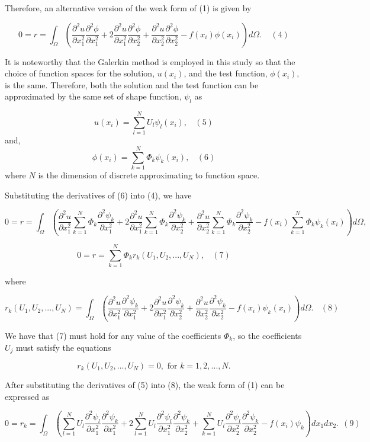 Therefore, an alternative version of the weak form of (1) is given by

\[ 0 = r = \int_{\Omega}{\left( \frac{\partial^2 u}{\partial x_1^2}\frac{\partial^2 \phi}{\partial x_1^2} + 2\frac{\partial^2 u}{\partial x_1^2}\frac{\partial^2 \phi}{\partial x_2^2} + \frac{\partial^2 u}{\partial x_2^2}\frac{\partial^2 \phi}{\partial x_2^2} - f(x_i)\phi(x_i)\right) d \Omega.} \ \ \ \ \ (4) \]

It is noteworthy that the Galerkin method is employed in this study so that the choice of function spaces for the solution, $u(x_i)$, and the test function, $\phi(x_i)$, is the same. Therefore, both the solution and the test function can be approximated by the same set of shape function, $\psi_l$ as

\[ u(x_i) = \sum_{l=1}^{N} U_{l}\psi_l(x_i), \ \ \ \ (5) \] and, \[ \phi(x_i) = \sum_{k=1}^{N} \Phi_{k}\psi_k(x_i), \ \ \ \ (6) \] where $ N $ is the dimension of discrete approximating to function space.

Substituting the derivatives of (6) into (4), we have

\[ 0 = r = \int_{\Omega}{\left( \frac{\partial^2 u}{\partial x_1^2}\sum_{k=1}^{N} \Phi_{k}\frac{\partial^2 \psi_{k}}{\partial x_1^2} + 2\frac{\partial^2 u}{\partial x_1^2}\sum_{k=1}^{N} \Phi_{k}\frac{\partial^2 \psi_{k}}{\partial x_2^2} + \frac{\partial^2 u}{\partial x_2^2}\sum_{k=1}^{N} \Phi_{k}\frac{\partial^2 \psi_{k}}{\partial x_2^2} - f(x_i)\sum_{k=1}^{N} \Phi_{k}\psi_{k}(x_i)\right) d \Omega,} \]

\[ 0 = r = \sum_{k=1}^{N}{\Phi_{k} r_{k}(U_1,U_2,...,U_N)}, \ \ \ \ (7) \]

where

\[ r_{k}(U_1,U_2,...,U_N) = \int_{\Omega}{\left( \frac{\partial^2 u}{\partial x_1^2}\frac{\partial^2 \psi_{k}}{\partial x_1^2} + 2\frac{\partial^2 u}{\partial x_1^2}\frac{\partial^2 \psi_{k}}{\partial x_2^2} + \frac{\partial^2 u}{\partial x_2^2}\frac{\partial^2 \psi_{k}}{\partial x_2^2} - f(x_i)\psi_{k}(x_i)\right) d \Omega.} \ \ \ \ (8) \]

We have that (7) must hold for any value of the coefficients $ \Phi_k $, so the coefficients $ U_j $ must satisfy the equations

\[ r_k(U_1, U_2,...,U_N) = 0, \mbox{ \ \ \ \ for } k=1,2,...,N. \]

After substituting the derivatives of (5) into (8), the weak form of (1) can be expressed as

\[ 0 = r_{k} = \int_{\Omega}\left( \sum_{l=1}^{N}{U_l\frac{\partial^2 \psi_l}{\partial x_1^2}}\frac{\partial^2\psi_k}{\partial x_1^2} + 2\sum_{l=1}^{N}{U_l\frac{\partial^2 \psi_l}{\partial x^2_1}}\frac{\partial^2\psi_k}{\partial x^2_2} + \sum_{k=1}^{N}{U_l\frac{\partial^2 \psi_l}{\partial x_2^2}}\frac{\partial^2\psi_k}{\partial x_2^2} - f(x_i)\psi_k \right) dx_1dx_2. \ \ (9) \]

